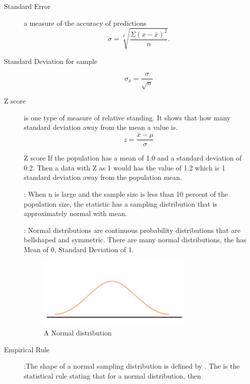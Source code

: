 \begin{description}
    \item[Standard Error]a measure of the accuracy of predictions
    \begin{equation}
\sigma =\sqrt[2]{\frac{\Sigma (x\minus \bar x)^{2}}{n}}.
\end{equation}
    \item[Standard Deviation for sample]
    \begin{equation}
    \sigma_{\bar x} = \frac{\sigma}{\sqrt{n}} 
\end{equation}
    \item[Z score] is one type of measure of relative standing. It shows that how many standard deviation away from the mean a value is.
    \begin{equation}
      z=\frac{\bar x-\mu}{\sigma}
    \end{equation}
    \begin{examplebox}{Z score}
      If the population has a mean of 1.0 and a standard deviation of 0.2. Then a data with Z as 1 would has the value of 1.2 which is 1 standard deviation away from the population mean.
    \end{examplebox}
    \item[]:  When n is large and the sample size is less than 10 percent of the population size, the statistic
has a sampling distribution that is approximately
normal with mean.
    \item[]: Normal distributions are continuous probability distributions that are bellshaped and symmetric. There are many normal distributions, the  has Mean of 0, Standard Deviation of 1.
    \begin{figure}[H]
      \centering
    \includegraphics[width=75mm]{normald.png}
    \caption{A Normal distribution}
    \label{Figure}
\end{figure}
    \item[Empirical Rule]:The shape of a normal sampling distribution is defined by . The is the statistical rule stating that for a normal distribution, then

\end{description}
